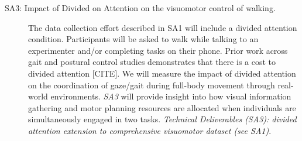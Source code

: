 \begin{description}
    \item[SA3: Impact of Divided on Attention on the visuomotor control of walking.] {The data collection effort described in SA1 will include a divided attention condition. Participants will be asked to walk while talking to an experimenter and/or completing tasks on their phone.  Prior work across gait and postural control studies demonstrates that there is a cost to divided attention [CITE]. We will measure the impact of divided attention on the coordination of gaze/gait during full-body movement through real-world environments. \textit{SA3} will provide insight into how visual information gathering and motor planning resources are allocated when individuals are simultaneously engaged in two tasks. \textit{Technical Deliverables (SA3): divided attention extension to comprehensive visuomotor dataset (see SA1)}}.

 
 
    


\end{description}



